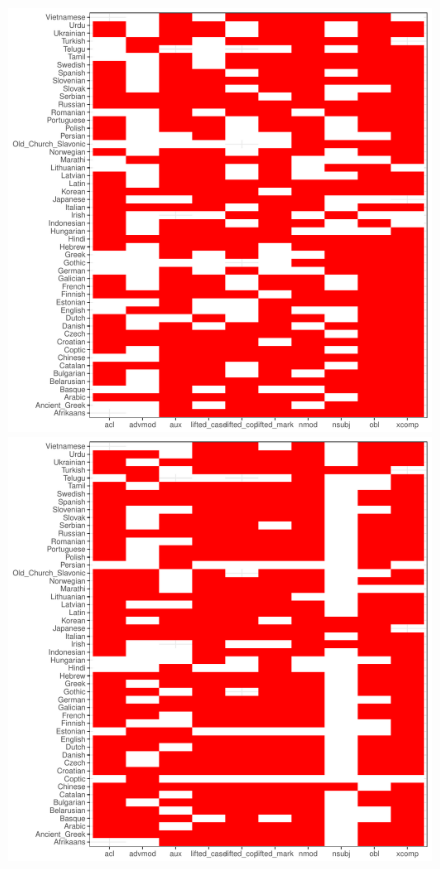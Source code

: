 \documentclass[12pt]{article}
\begin{document}
\begin{figure}
    \centering
    
    \includegraphics[scale=.25]{../results/correlations/figures/coverage-langmod-best.pdf}
    \includegraphics[scale=.25]{../results/correlations/figures/coverage-parse-best.pdf}

\end{figure}
\end{document}
